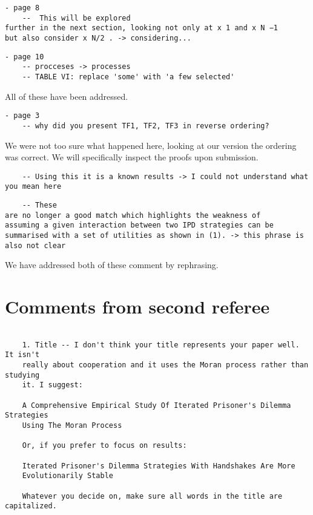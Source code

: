 \documentclass[a4]{article}
\begin{document}
\begin{verbatim}
- page 8
	--  This will be explored
further in the next section, looking not only at x 1 and x N −1
but also consider x N/2 . -> considering...
\end{verbatim}

\begin{verbatim}
- page 10
	-- procceses -> processes
	-- TABLE VI: replace 'some' with 'a few selected'
\end{verbatim}

All of these have been addressed. 

\begin{verbatim}
- page 3
	-- why did you present TF1, TF2, TF3 in reverse ordering?
\end{verbatim}

We were not too sure what happened here, looking at our version the ordering was
correct. We will specifically inspect the proofs upon submission.

\begin{verbatim}
	-- Using this it is a known results -> I could not understand what you mean here
\end{verbatim}

\begin{verbatim}
	-- These
are no longer a good match which highlights the weakness of
assuming a given interaction between two IPD strategies can be
summarised with a set of utilities as shown in (1). -> this phrase is also not clear
\end{verbatim}

We have addressed both of these comment by rephrasing.

\section{Comments from second referee}

\begin{verbatim}

    1. Title -- I don't think your title represents your paper well. It isn't
    really about cooperation and it uses the Moran process rather than studying
    it. I suggest: 

    A Comprehensive Empirical Study Of Iterated Prisoner's Dilemma Strategies
    Using The Moran Process

    Or, if you prefer to focus on results:

    Iterated Prisoner's Dilemma Strategies With Handshakes Are More
    Evolutionarily Stable

    Whatever you decide on, make sure all words in the title are capitalized.

\end{verbatim}
\end{document}
